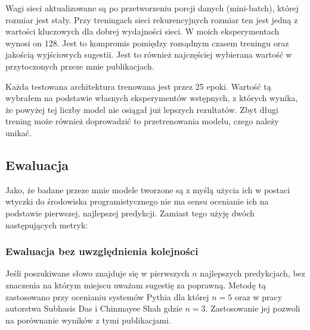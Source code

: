 Wagi sieci aktualizowane są po przetworzeniu porcji danych (mini-batch), której rozmiar jest stały. Przy treningach sieci rekurencyjnych rozmiar
ten jest jedną z wartości kluczowych dla dobrej wydajności sieci. W moich eksperymentach wynosi on 128. Jest to kompromis pomiędzy rozsądnym 
czasem treningu oraz jakością wyjściowych sugestii. Jest to również najczęściej wybierana wartość w przytoczonych przeze mnie publikacjach.

Każda testowana architektura trenowana jest przez 25 epoki. Wartość tą wybrałem na podstawie własnych eksperymentów wstępnych, z których wynika, że 
powyżej tej liczby model nie osiągał już lepszych rezultatów. Zbyt długi trening może również doprowadzić to przetrenowania modelu, czego 
należy unikać. 

\subsection{Ewaluacja}
Jako, że badane przeze mnie modele tworzone są z myślą użycia ich w postaci wtyczki do środowiska programistycznego nie ma sensu ocenianie ich na podstawie pierwszej, najlepszej predykcji. 
Zamiast tego użyję dwóch następujących metryk: 

\subsubsection{Ewaluacja bez uwzględnienia kolejności}
Jeśli poszukiwane słowo znajduje się w pierwszych \begin{math}n\end{math} najlepszych predykcjach, bez znaczenia na którym miejscu uważam sugestię za poprawną. Metodę tą zastosowano przy ocenianiu systemów
Pythia \cite{pythia} dla której \begin{math}n = 5\end{math} oraz w pracy autorstwa Subhasis Das i Chinmayee Shah \cite{contextual_code_completion} gdzie \begin{math}n = 3\end{math}. Zastosowanie jej pozwoli na porównanie 
wyników z tymi publikacjami. 

